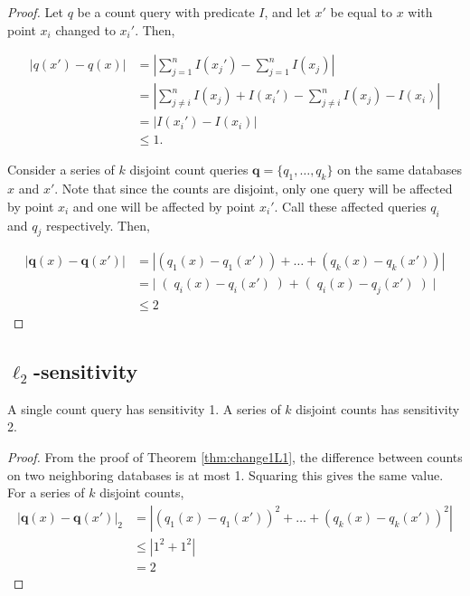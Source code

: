 \documentclass[11pt]{scrartcl} %
\begin{document}
\begin{proof}
Let $q$ be a count query with predicate $I$, and let $x'$ be equal to $x$ with point $x_i$ changed to $x_i'$. Then,

\begin{align*}
\left\vert q(x') - q(x) \right\vert &= \left\vert \sum_{j=1}^n I(x_j') - \sum_{j=1}^n I(x_j) \right\vert \\
	&= \left\vert \sum_{j \ne i}^n I(x_j) + I(x_i') - \sum_{j \ne i}^n I(x_j) - I(x_i) \right\vert \\
	&= \left\vert I(x_i') - I(x_i) \right\vert \\
	& \le 1.
\end{align*}

Consider a series of $k$ disjoint count queries $\mathbf{q} = \{q_1, \ldots, q_k\}$ on the same databases $x$ and $x'$. Note that since the counts are disjoint, only one query will be affected by point $x_i$ and one will be affected by point $x_i'$. Call these affected queries $q_i$ and $q_j$ respectively. Then,

\begin{align*}
\left\vert \mathbf{q}(x) - \mathbf{q}(x') \right\vert &= \left\vert \left(q_1(x) - q_1(x')\right) + \ldots + \left(q_k(x) - q_k(x')\right) \right\vert \\
	&= \left\vert \right(q_i(x) - q_i(x')\left) + \right(q_i(x) - q_j(x')\left) \right\vert \\
	&\le 2
\end{align*}
\end{proof}

\subsection{$\ell_2$-sensitivity}

\begin{theorem}
A single count query has sensitivity 1. A series of $k$ disjoint counts has sensitivity 2.
\end{theorem}

\begin{proof}
From the proof of Theorem \ref{thm:change1L1}, the difference between counts on two neighboring databases is at most 1. Squaring this gives the same value. For a series of $k$ disjoint counts,
\begin{align*}
\left\vert \mathbf{q}(x) - \mathbf{q}(x') \right\vert_2 &= \left\vert \left(q_1(x) - q_1(x')\right)^2 + \ldots + \left(q_k(x) - q_k(x')\right)^2 \right\vert \\
 & \le \left\vert 1^2 + 1^2 \right\vert \\
 &= 2
 \end{align*}
\end{proof}
\end{document}
